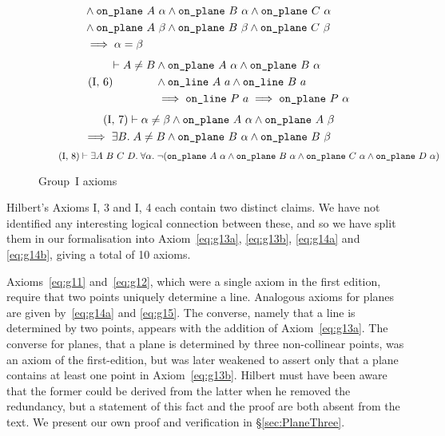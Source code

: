 \begin{figure}
\begin{equation}
\begin{split}
    &\wedge \code{on\_plane}\ A\ \alpha \wedge \code{on\_plane}\ B\ \alpha \wedge \code{on\_plane}\ C\ \alpha\\
    &\wedge \code{on\_plane}\ A\ \beta \wedge \code{on\_plane}\ B\ \beta \wedge \code{on\_plane}\ C\ \beta\\
    &\implies \alpha = \beta
  \end{split}
\end{equation}
\begin{equation}\label{eq:g16}
  \tag{I,~6}
  \begin{split}
    \vdash A \neq B &\wedge \code{on\_plane}\ A\ \alpha \wedge \code{on\_plane}\ B\ \alpha\\
    &\wedge \code{on\_line}\ A\ a \wedge \code{on\_line}\ B\ a\\
    &\implies \code{on\_line}\ P\ a \implies \code{on\_plane}\ P\ \alpha
  \end{split}
\end{equation}
\begin{multline}
\label{eq:g17}
  \tag{I,~7}
   \vdash\alpha \neq \beta \wedge \texttt{on\_plane}\ A\ \alpha \wedge \texttt{on\_plane}\ A\ \beta\\
   \implies \exists B.\; A \neq B \wedge \texttt{on\_plane}\ B\ \alpha \wedge \texttt{on\_plane}\ B\ \beta
\end{multline}
\begin{equation}
\label{eq:g18}
  \tag{I,~8}
  \vdash\exists A\ B\ C\ D.\; \forall \alpha.\; \neg(\code{on\_plane}\ A\ \alpha \wedge \code{on\_plane}\ B\ \alpha \wedge \code{on\_plane}\ C\ \alpha \wedge \code{on\_plane}\ D\ \alpha)
\end{equation}
\caption{Group~I axioms}
\end{figure}\label{fig:Group1Axioms}

Hilbert's Axioms I, 3 and I, 4 each contain two distinct claims. We have not identified any interesting logical connection between these, and so we have split them in our formalisation into Axiom~\ref{eq:g13a}, \ref{eq:g13b}, \ref{eq:g14a} and \ref{eq:g14b}, giving a total of 10 axioms.

Axioms~\ref{eq:g11} and~\ref{eq:g12}, which were a single axiom in the first edition, require that two points uniquely determine a line. Analogous axioms for planes are given by~\ref{eq:g14a} and \ref{eq:g15}. The converse, namely that a line is determined by two points, appears with the addition of Axiom~\ref{eq:g13a}. The converse for planes, that a plane is determined by three non-collinear points, was an axiom of the first-edition, but was later weakened to assert only that a plane contains at least one point in Axiom~\ref{eq:g13b}. Hilbert must have been aware that the former could be derived from the latter when he removed the redundancy, but a statement of this fact and the proof are both absent from the text. We present our own proof and verification in \S\ref{sec:PlaneThree}.

